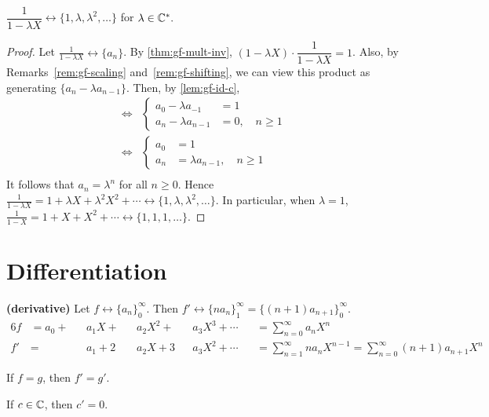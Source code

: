 \documentclass[a4paper, 12pt]{report}
\begin{document}
\begin{cor}\label{cor:gf-1-lambda_X}
$\dfrac{1}{1 - \lambda X} \longleftrightarrow \{1, \lambda, \lambda^2, \dots\}$ for $\lambda \in \mathbb{C}^*.$
\end{cor}
\begin{proof}
Let $\frac{1}{1 - \lambda X} \longleftrightarrow \{a_n\}$.
By \cref{thm:gf-mult-inv}, $(1 - \lambda X) \cdot \dfrac{1}{1 - \lambda X} = 1$. Also, by Remarks~\ref{rem:gf-scaling} and~\ref{rem:gf-shifting}, we can view this product as generating $\{a_n - \lambda a_{n - 1}\}$. Then, by \cref{lem:gf-id-c},
\begin{align*}
    \iff &\begin{cases}
    a_0 - \lambda a_{-1} &= 1\\
    a_n - \lambda a_{n - 1} &= 0, \quad n \geq 1
    \end{cases}\\
    \iff &\begin{cases}
    a_0 &= 1\\
    a_n &= \lambda a_{n - 1}, \quad n \geq 1
    \end{cases}\\
\end{align*}
It follows that $a_n = \lambda^n$ for all $n \geq 0$. Hence $\frac{1}{1 - \lambda X} = 1 + \lambda X + \lambda^2 X^2 + \cdots \longleftrightarrow \{1, \lambda, \lambda^2, \dots\}$. In particular, when $\lambda = 1$, $\frac{1}{1 - X} = 1 + X + X^2 + \cdots \longleftrightarrow \{1, 1, 1, \dots\}$.
\end{proof}

\section{Differentiation}
\begin{defn}\label{def:gf-deriv}
\textbf{(derivative)} Let $f \longleftrightarrow \{a_n\}_0^\infty$. Then $f' \longleftrightarrow \{n a_n\}_1^\infty = \{(n + 1) a_{n + 1}\}_0^\infty$.
\begin{alignat*}{6}
    f &= a_0 + &&a_1 X + &&a_2 X^2 + &&a_3 X^3 + \cdots &&= \sum_{n = 0}^\infty a_n X^n\\
    f'&=       &&a_1 + 2 &&a_2 X + 3 &&a_3 X^2 + \cdots &&= \sum_{n = 1}^\infty n a_n X^{n - 1} = \sum_{n = 0}^\infty (n + 1) a_{n + 1} X^{n}
\end{alignat*}
\end{defn}
\begin{rem}\label{rem:gf-eq-deriv-eq}
If $f = g$, then $f' = g'$.
\end{rem}
\begin{rem}\label{rem:gf-constant-deriv}
If $c \in \mathbb{C}$, then $c' = 0$.
\end{rem}
\end{document}
